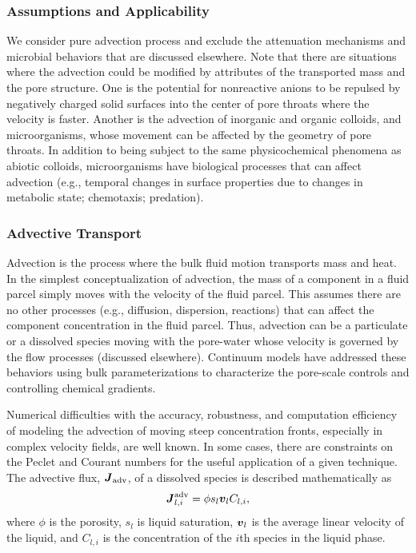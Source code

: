 \subsubsection{Assumptions and Applicability}

We consider pure advection process and exclude the attenuation mechanisms and microbial 
behaviors that are discussed elsewhere. 
Note that there are situations where the advection could be modified by attributes of 
the transported mass and the pore structure.  
One is the potential for nonreactive anions to be repulsed by negatively charged 
solid surfaces into the center of pore throats where the velocity is faster.  
Another is the advection of inorganic and organic colloids, and microorganisms, 
whose movement can be affected by the geometry of pore throats.  
In addition to being subject to the same physicochemical phenomena as abiotic colloids, 
microorganisms have biological processes that can affect advection (e.g., temporal 
changes in surface properties due to changes in metabolic state; chemotaxis; predation).  


\subsubsection{Advective Transport}  
\label{sec:transport-advection}

Advection is the process where the bulk fluid motion transports mass and heat.  
In the simplest conceptualization of advection, the mass of a component in a fluid 
parcel simply moves with the velocity of the fluid parcel.  
This assumes there are no other processes (e.g., diffusion, dispersion, reactions) 
that can affect the component concentration in the fluid parcel.  
Thus, advection can be a particulate or a dissolved species moving with the pore-water 
whose velocity is governed by the flow processes (discussed elsewhere).  
Continuum models have addressed these behaviors using bulk parameterizations 
to characterize the pore-scale controls and controlling chemical gradients.

Numerical difficulties with the accuracy, robustness, and computation efficiency 
of modeling the advection of moving steep concentration fronts, especially in 
complex velocity fields, are well known.  
In some cases, there are constraints on the Peclet and Courant numbers for the 
useful application of a given technique.
The advective flux, ${\boldsymbol{J}}_{\text{adv}}$, of a dissolved species is described 
mathematically as
\begin{equation} \label{eq:AdvectiveFlux} 
  {\boldsymbol{J}}_{l,i}^\text{adv} = \phi s_l \boldsymbol{v}_l C_{l,i},  
\end{equation}
where $\phi$ is the porosity, $s_l$ is liquid saturation, $\boldsymbol{v}_l$ is the 
average linear velocity of the liquid, and $C_{l,i}$ is the concentration of the $i$th species in the liquid phase.


